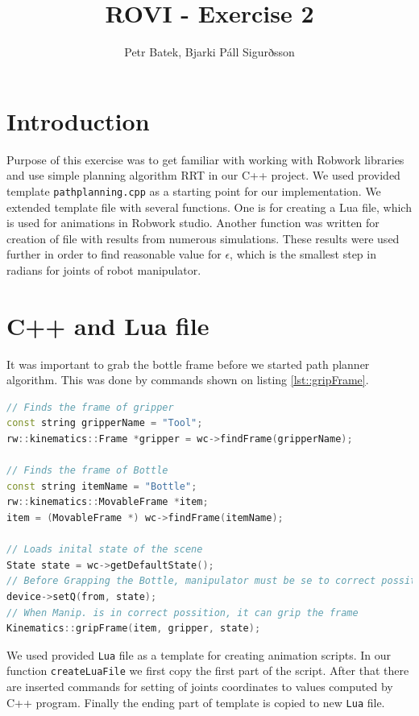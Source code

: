 \documentclass[11pt]{article}
\title{ROVI - Exercise 2}
\author{Petr Batek, Bjarki Páll Sigurðsson}
\numberwithin{equation}{section}
\begin{document}

\maketitle

\newpage

\section{Introduction}
Purpose of this exercise was to get familiar with working with Robwork libraries and use simple planning algorithm RRT in our C++ project. We used provided template \texttt{pathplanning.cpp} as a starting point for our implementation. We extended template file with several functions. One is for creating a Lua file, which is used for animations in Robwork studio. Another function was written for creation of file with results from numerous simulations. These results were used further in order to find reasonable value for $\epsilon$, which is the smallest step in radians for joints of robot manipulator.

\section{C++ and Lua file}
It was important to grab the bottle frame before we started path planner algorithm. This was done by commands shown on listing \ref{lst::gripFrame}.


\begin{lstlisting}[caption={Grabbing Bottle frame into Gripper}, language=C++, label={lst::gripFrame}]
// Finds the frame of gripper
const string gripperName = "Tool";
rw::kinematics::Frame *gripper = wc->findFrame(gripperName);

// Finds the frame of Bottle
const string itemName = "Bottle";
rw::kinematics::MovableFrame *item;
item = (MovableFrame *) wc->findFrame(itemName);

// Loads inital state of the scene
State state = wc->getDefaultState();
// Before Grapping the Bottle, manipulator must be se to correct possition
device->setQ(from, state);
// When Manip. is in correct possition, it can grip the frame
Kinematics::gripFrame(item, gripper, state);


\end{lstlisting}

We used provided \texttt{Lua} file as a template for creating animation scripts. In our function \texttt{createLuaFile} we first copy the first part of the script. After that there are inserted commands for setting of joints coordinates to values computed by C++ program. Finally the ending part of template is copied to new \texttt{Lua} file.
\end{document}
